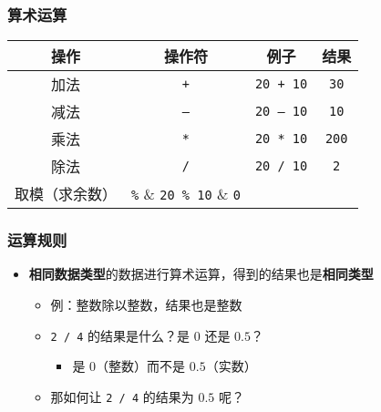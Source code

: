 \begin{frame}[fragile]
    \frametitle{算术运算}

    \begin{table}[]
        \begin{tabular}{cccc}
            \toprule
            操作          & 操作符        & 例子                & 结果            \\
            \midrule
            加法          & \lstinline|+| & \lstinline|20 + 10| & \lstinline|30|  \\
            减法          & \lstinline|–| & \lstinline|20 – 10| & \lstinline|10|  \\
            乘法          & \lstinline|*| & \lstinline|20 * 10| & \lstinline|200| \\
            除法          & \lstinline|/| & \lstinline|20 / 10| & \lstinline|2|   \\
            取模（求余数）& \lstinline|%| & \lstinline|20 % 10| & \lstinline|0|   \\
            \bottomrule
        \end{tabular}
    \end{table}
\end{frame}

\begin{frame}[fragile]
    \frametitle{运算规则}

    \begin{itemize}[<+->]
        \item \textbf{相同数据类型}的数据进行算术运算，得到的结果也是\textbf{相同类型}

            \begin{itemize}
                \item 例：整数除以整数，结果也是整数
                \item \lstinline|2 / 4| 的结果是什么？是 $0$ 还是 $0.5$？

                    \begin{itemize}
                        \item 是 $0$（整数）而不是 $0.5$（实数）
                    \end{itemize}

                \item 那如何让 \lstinline|2 / 4| 的结果为 $0.5$ 呢？
            \end{itemize}

    \end{itemize}
\end{frame}


